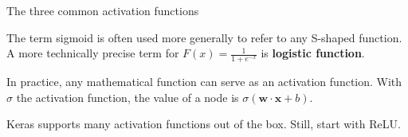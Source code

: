 \begin{frame}{The three common activation functions}
  \begin{withmargin}
    \begin{tdmargin}
      The term sigmoid is often used more generally to refer to any S-shaped
      function. A more technically precise term for
      $F(x)=\frac{1}{1+e^{-x}}$ is \textbf{logistic function}.
      \par\medskip
      In practice, any mathematical function can serve as an activation
      function. With $\sigma$ the activation function, the value of a node is
      $\sigma(\boldsymbol{w} \cdot \boldsymbol{x} + b)$.
      \par\medskip
      Keras supports many activation functions out of the box. Still, start with
      ReLU.
    \end{tdmargin}
  \end{withmargin}
\end{frame}

